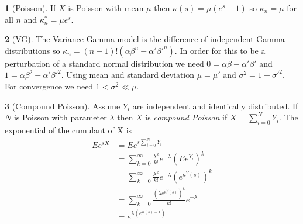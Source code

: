 \documentclass[fleqn]{amsart}
\theoremstyle{definition}
\newtheorem*{example}{}
\begin{document}
\begin{example}[Poisson]
If \(X\) is Poisson
with mean \(\mu\) then \(\kappa(s) = \mu(e^s - 1)\) so
\(\kappa_n = \mu\) for all \(n\) and
\(\kappa_n^* = \mu e^s\).
\end{example}

\begin{example}[VG]
The Variance Gamma model is the difference of independent Gamma distributions
so \(\kappa_n = (n-1)!(\alpha\beta^n - \alpha'\beta'^n)\).
In order for this to be a perturbation of a standard normal
distribution we need \(0 = \alpha\beta - \alpha'\beta'\)
and \(1 = \alpha\beta^2 - \alpha'\beta'^2\).
Using mean and standard deviation
\(\mu = \mu'\) and \(\sigma^2 = 1 + \sigma'^2\).
For convergence we need \(1 < \sigma^2 \ll \mu\).
\end{example}

\begin{example}[Compound Poisson]
Assume \(Y_i\) are independent and identically distributed. If \(N\) is
Poisson with parameter \(\lambda\) then \(X\) is {\em compound Poisson}
if \(X = \sum_{i=0}^N Y_i\).
The exponential of the cumulant of X is
\begin{align*}
Ee^{sX} &= Ee^{s\sum_{i=0}^N Y_i}\\
&= \sum_{k=0}^\infty \frac{\lambda^k}{k!}e^{-\lambda}(Ee^{Y_i})^k\\
&= \sum_{k=0}^\infty \frac{\lambda^k}{k!}e^{-\lambda}(e^{\kappa^Y(s)})^k\\
&= \sum_{k=0}^\infty \frac{(\lambda e^{\kappa^Y(s)})^k}{k!}e^{-\lambda}\\
&= e^{\lambda(e^{\kappa(s) - 1})}
\end{align*}
\end{example}
\end{document}
